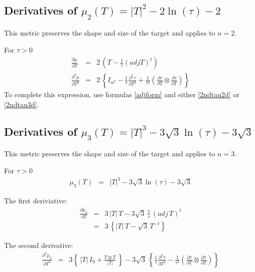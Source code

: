 \documentclass{report}
\begin{document}
\subsection{Derivatives of $\mu_2(T)=|T|^2 - 2 \ln(\tau) - 2$}

\noindent This metric preserves the shape and size of the target and applies
to $n=2$. \newline

\noindent For $\tau>0$
\begin{eqnarray}
\frac{\partial \mu}{\partial T} & = & 2 \, \left( T - \frac{1}{\tau} (adj T)^t \right) \\
\frac{\partial^2 \mu}{\partial T^2} & = & 2 \, \left\{ I_{n^2}  - \frac{1}{\tau} \frac{\partial^2 \tau}{\partial T^2} + \frac{1}{\tau^2} \left( \frac{\partial \tau}{\partial T} \otimes \frac{\partial \tau}{\partial T} \right) \right\}
\end{eqnarray}
To complete this expression, use formulas \ref{adjform} and either 
\ref{2ndtau2d} or \ref{2ndtau3d}. \newline

\subsection{Derivatives of $\mu_3(T)=|T|^3 - 3 \sqrt{3} \ln(\tau) - 3 \sqrt{3}$}

\noindent This metric preserves the shape and size of the target and applies
to $n=3$. \newline

\noindent For $\tau>0$
\begin{eqnarray}
\mu_3(T) & = & |T|^3 - 3 \sqrt{3} \ln(\tau) - 3 \sqrt{3} 
\end{eqnarray}

\noindent The first deriviative:
\begin{eqnarray}
\frac{\partial \mu_3}{\partial T} & = & 3 \, |T| \, T - 3 \sqrt{3} \, \frac{1}{\tau} \, (adj \, T)^t \\
 & = & 3 \, \left\{ |T| \, T - \sqrt{3} \, T^{-t} \right\}
\end{eqnarray}

\noindent The second derivative:
\begin{eqnarray}
\frac{\partial^2 \mu_3}{\partial T^2} & = & 3 \left\{ \, |T| \, I_{9} + \frac{T \otimes T}{|T|} \, \right\} - 3 \sqrt{3} \, \left\{ \frac{1}{\tau} \frac{\partial^2 \tau}{\partial T^2} - \frac{1}{\tau^2} \left( \frac{\partial \tau}{\partial T} \otimes \frac{\partial \tau}{\partial T} \right) \right\} \nonumber \\
\end{eqnarray}
\end{document}
